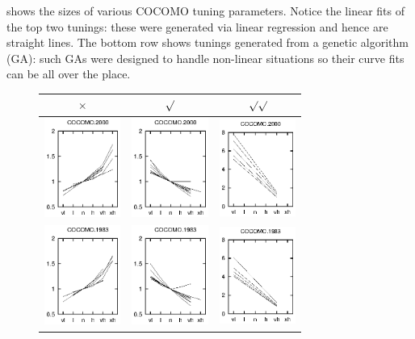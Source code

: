  shows the sizes of various COCOMO tuning parameters.
Notice the linear fits of the top two tunings: these were generated
via linear regression and hence are straight lines. The bottom row
shows tunings generated from a genetic algorithm (GA): such GAs were
designed to handle non-linear situations so their curve fits can be
all over the place.
\begin{figure}
\begin{center}
\begin{tabular}{c|c|c}
$\times$ & $\surd$ & $\surd\surd$ \\\hline
\includegraphics[width=2.5cm]{coc2000down.eps}&
\includegraphics[width=2.5cm]{coc2000up.eps}&
\includegraphics[width=2.5cm]{coc2000cliff.eps}\\

\includegraphics[width=2.5cm]{coc1983down.eps}&
\includegraphics[width=2.5cm]{coc1983up.eps}&
\includegraphics[width=2.5cm]{coc1983cliff.eps}\\


\end{tabular}
\end{center}
\end{figure}
